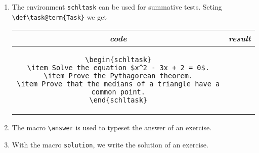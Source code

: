 \documentclass[12pt,a4page]{article}
\makeatletter
\def\task@term{Task}
\makeatother
\begin{document}
\begin{enumerate}
\begin{center}
\begin{tabular}{c|p{}}
{\begin{exercise}
                       \item Prove that the sum of the angles of a triangle equals $180^\circ$.
                       \end{exercise}
                       }
    \end{tabular}
  \end{center}
\item The environment \texttt{schltask} can be used for summative tests. Seting \verb|\def\task@term{Task}| we get
    \begin{center}
    \footnotesize
    \begin{tabular}{c|p{}}
      \textit{\large code} & \hfill\textit{\large result}\hfill\phantom{.} \\ \hline
      \begin{minipage}[t]{0.4\textwidth}
\begin{lstlisting}
\begin{schltask}
\item Solve the equation $x^2 - 3x + 2 = 0$.
\item Prove the Pythagorean theorem.
\item Prove that the medians of a triangle have a common point.
\end{schltask}
        \end{lstlisting}
      \end{minipage} &
                       \parbox[t]{0.4\textwidth}{%
                       \begin{schltask}
                       \item Solve the equation $x^2 - 3x + 2 = 0$.
                       \item Prove the Pythagorean theorem.
                       \item Prove that the medians of a triangle have a common point.
                       \end{schltask}
                       }
    \end{tabular}
  \end{center}
\item The macro \verb/\answer/ is used to typeset the answer of an exercise.
\item With the macro \texttt{solution}, we write the solution of an exercise.

\end{enumerate}
\end{document}
